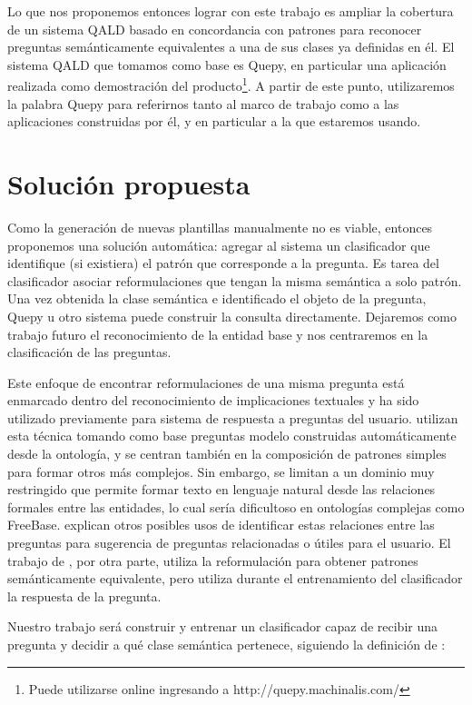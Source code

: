 Lo que nos proponemos entonces lograr con este trabajo es ampliar la cobertura de un sistema QALD basado en concordancia con patrones para reconocer preguntas semánticamente equivalentes a una de sus clases ya definidas en él. El sistema QALD que tomamos como base es Quepy, en particular una aplicación realizada como demostración del producto\footnote{Puede utilizarse online ingresando a http://quepy.machinalis.com/}. A partir de este punto, utilizaremos la palabra Quepy para referirnos tanto al marco de trabajo como a las aplicaciones construidas por él, y en particular a la que estaremos usando.

\section{Solución propuesta}

Como la generación de nuevas plantillas manualmente no es viable, entonces proponemos una solución automática: agregar al sistema un clasificador que identifique (si existiera) el patrón que corresponde a la pregunta. Es tarea del clasificador asociar reformulaciones que tengan la misma semántica a solo patrón. Una vez obtenida la clase semántica e identificado el objeto de la pregunta, Quepy u otro sistema puede construir la consulta directamente. Dejaremos como trabajo futuro el reconocimiento de la entidad base y nos centraremos en la clasificación de las preguntas.

Este enfoque de encontrar reformulaciones de una misma pregunta está enmarcado dentro del reconocimiento de implicaciones textuales y ha sido utilizado previamente para sistema de respuesta a preguntas del usuario. \citet{ou_entailement} utilizan esta técnica tomando como base preguntas modelo construidas automáticamente desde la ontología, y se centran también en la composición de patrones simples para formar otros más complejos. Sin embargo, se limitan a un dominio muy restringido que permite formar texto en lenguaje natural desde las relaciones formales entre las entidades, lo cual sería dificultoso en ontologías complejas como FreeBase. \citet{rui_relations} explican otros posibles usos de identificar estas relaciones entre las preguntas para sugerencia de preguntas relacionadas o útiles para el usuario. El trabajo de \citet{Kosseimmuyparecido}, por otra parte, utiliza la reformulación para obtener patrones semánticamente equivalente, pero utiliza durante el entrenamiento del clasificador la respuesta de la pregunta.

Nuestro trabajo será construir y entrenar un clasificador capaz de recibir una pregunta y decidir a qué clase semántica pertenece, siguiendo la definición de \citet{Sebastiani-text-categorization}:

